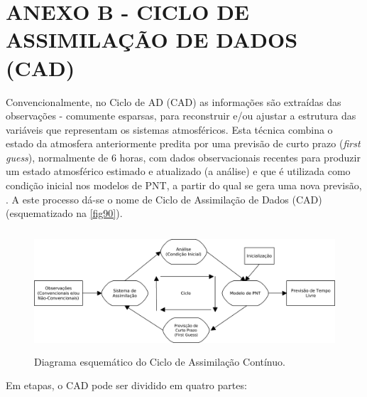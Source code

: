 \hypertarget{estilo:anexo}{}

\chapter{ANEXO B - CICLO DE ASSIMILAÇÃO DE DADOS (CAD)}
\label{anexoB}

Convencionalmente, no Ciclo de AD (CAD) as informações são extraídas das observações - comumente esparsas, para reconstruir e/ou ajustar a estrutura das variáveis que representam os sistemas atmosféricos. Esta técnica combina o estado da atmosfera anteriormente predita por uma previsão de curto prazo (\textit{first guess}), normalmente de 6 horas, com dados observacionais recentes para produzir um estado atmosférico estimado e atualizado (a análise) e que é utilizada como condição inicial nos modelos de PNT, a partir do qual se gera uma nova previsão, \cite{kalnay03}. A este processo dá-se o nome de Ciclo de Assimilação de Dados (CAD) (esquematizado na \autoref{fig90}).

\begin{figure}[!hbp]
\centering
\includegraphics[height=4.5cm]{./figs/ciclo_ad.png}
\caption{Diagrama esquemático do Ciclo de Assimilação Contínuo.}
\label{fig90}
\end{figure}

Em etapas, o CAD pode ser dividido em quatro partes:

